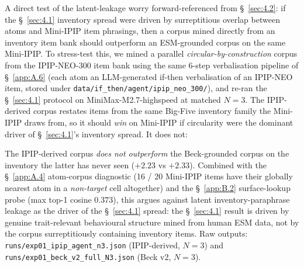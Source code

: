 A direct test of the latent-leakage worry forward-referenced from \S~\ref{sec:4.2}: if the \S~\ref{sec:4.1} inventory spread were driven by surreptitious overlap between atoms and Mini-IPIP item phrasings, then a corpus mined directly from an inventory item bank should outperform an ESM-grounded corpus on the same Mini-IPIP. To stress-test this, we mined a parallel \textit{circular-by-construction} corpus from the IPIP-NEO-300 \cite{ipipneo} item bank using the same 6-step verbalisation pipeline of \S~\ref{app:A.6} (each atom an LLM-generated if-then verbalisation of an IPIP-NEO item, stored under \texttt{data/\allowbreak{}if\_\allowbreak{}then/\allowbreak{}agent/\allowbreak{}ipip\_\allowbreak{}neo\_\allowbreak{}300/\allowbreak{}}), and re-ran the \S~\ref{sec:4.1} protocol on MiniMax-M2.7-highspeed at matched $N=3$. The IPIP-derived corpus restates items from the same Big-Five inventory family the Mini-IPIP draws from, so it should \textit{win} on Mini-IPIP if circularity were the dominant driver of \S~\ref{sec:4.1}'s inventory spread. It does not:

\begin{table}[t]
\centering
{}
\caption{Cross-distribution comparison of corpus origin on MiniMax-M2.7-highspeed Mini-IPIP, $N=3$ matched runs per condition. The IPIP-derived corpus \textit{does not outperform} the Beck-grounded ESM corpus on the inventory the latter has never seen, arguing against latent inventory-paraphrase leakage as the driver of \S~\ref{sec:4.1}.}
\label{tab:rq2-ipip-corpus}
\end{table}

The IPIP-derived corpus \textit{does not outperform} the Beck-grounded corpus on the inventory the latter has never seen ($+2.23$ vs $+2.33$). Combined with the \S~\ref{app:A.4} atom-corpus diagnostic (16 / 20 Mini-IPIP items have their globally nearest atom in a \textit{non-target} cell altogether) and the \S~\ref{app:B.2} surface-lookup probe (max top-1 cosine $0.373$), this argues against latent inventory-paraphrase leakage as the driver of the \S~\ref{sec:4.1} spread: the \S~\ref{sec:4.1} result is driven by genuine trait-relevant behavioural structure mined from human ESM data, not by the corpus surreptitiously containing inventory items. Raw outputs: \texttt{runs/\allowbreak{}exp01\_\allowbreak{}ipip\_\allowbreak{}agent\_\allowbreak{}n3.json} (IPIP-derived, $N=3$) and \texttt{runs/\allowbreak{}exp01\_\allowbreak{}beck\_\allowbreak{}v2\_\allowbreak{}full\_\allowbreak{}N3.json} (Beck v2, $N=3$).

